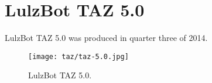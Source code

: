 %
%
%
%
%

\section{LulzBot TAZ 5.0}
LulzBot TAZ 5.0 was produced in quarter three of 2014.

\begin{figure}[h!]
\texttt{[image: taz/taz-5.0.jpg]}
 \caption{LulzBot TAZ 5.0.}
 \label{fig:taz-5.0}
\end{figure}

